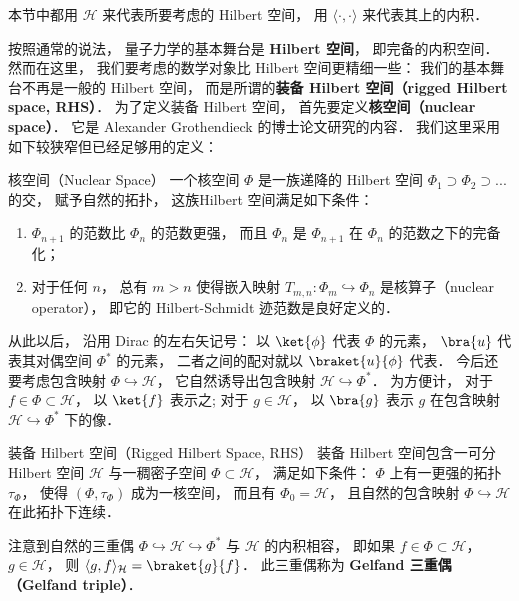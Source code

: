 
本节中都用 $\mathcal{H}$ 来代表所要考虑的 Hilbert 空间， 用 $\langle\cdot,\cdot\rangle$ 来代表其上的内积． 

按照通常的说法， 量子力学的基本舞台是 \textbf{Hilbert 空间}， 即完备的内积空间． 然而在这里， 我们要考虑的数学对象比 Hilbert 空间更精细一些： 我们的基本舞台不再是一般的 Hilbert 空间， 而是所谓的\textbf{装备 Hilbert 空间（rigged Hilbert space, RHS）}． 为了定义装备 Hilbert 空间， 首先要定义\textbf{核空间（nuclear space）}． 它是 Alexander Grothendieck 的博士论文研究的内容． 我们这里采用如下较狭窄但已经足够用的定义：

\begin{definition}{核空间（Nuclear Space）}
一个核空间 $\Phi$ 是一族递降的 Hilbert 空间 $\Phi_1\supset\Phi_2\supset...$ 的交， 赋予自然的拓扑， 这族Hilbert 空间满足如下条件：
\begin{enumerate}
\item $\Phi_{n+1}$ 的范数比 $\Phi_n$ 的范数更强， 而且 $\Phi_n$ 是 $\Phi_{n+1}$ 在 $\Phi_n$ 的范数之下的完备化；
\item 对于任何 $n$， 总有 $m>n$ 使得嵌入映射 $T_{m,n}:\Phi_{m}\hookrightarrow\Phi_n$ 是核算子（nuclear operator）， 即它的 Hilbert-Schmidt 迹范数是良好定义的．
\end{enumerate}
\end{definition}

    从此以后， 沿用 Dirac 的左右矢记号： 以 $\ket{\phi}$ 代表 $\Phi$ 的元素， $\bra{u}$ 代表其对偶空间 $\Phi^*$ 的元素， 二者之间的配对就以 $\braket{u}{\phi}$ 代表． 今后还要考虑包含映射 $\Phi\hookrightarrow\mathcal{H}$， 它自然诱导出包含映射 $\mathcal{H}\hookrightarrow\Phi^*$． 为方便计， 对于 $f\in\Phi\subset\mathcal{H}$， 以 $\ket{f}$ 表示之; 对于 $g\in\mathcal{H}$， 以 $\bra{g}$ 表示 $g$ 在包含映射 $\mathcal{H}\hookrightarrow\Phi^*$ 下的像．

\begin{definition}{装备 Hilbert 空间（Rigged Hilbert Space, RHS）}
装备 Hilbert 空间包含一可分 Hilbert 空间 $\mathcal{H}$ 与一稠密子空间 $\Phi\subset\mathcal{H}$， 满足如下条件： $\Phi$ 上有一更强的拓扑 $\tau_\Phi$， 使得 $(\Phi,\tau_\Phi)$ 成为一核空间， 而且有 $\Phi_0=\mathcal{H}$， 且自然的包含映射 $\Phi\hookrightarrow\mathcal{H}$ 在此拓扑下连续．
\end{definition}

    注意到自然的三重偶 $\Phi\hookrightarrow\mathcal{H}\hookrightarrow\Phi^*$ 与 $\mathcal{H}$ 的内积相容， 即如果 $f\in\Phi\subset\mathcal{H}$， $g\in\mathcal{H}$， 则 $\langle g,f\rangle_{\mathcal{H}}=\braket{g}{f}$． 此三重偶称为 \textbf{Gelfand 三重偶（Gelfand triple）}．

